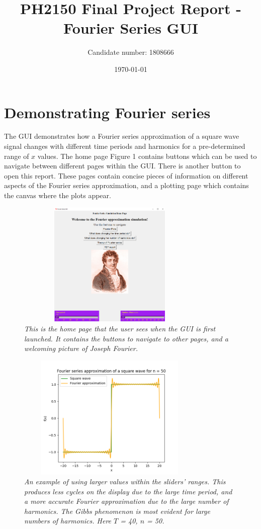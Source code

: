 \documentclass[11pt]{article}								%
\title{PH2150 Final Project Report - Fourier Series GUI}
\author{Candidate number: 1808666}
\date{\today}                                      							%
\begin{document}
\maketitle
\section{Demonstrating Fourier series \label{sec:section1}}
The GUI demonstrates how a Fourier series approximation of a square wave signal changes with different time periods and harmonics for a pre-determined range of $x$ values. The home page Figure 1 contains buttons which can be used to navigate between different pages within the GUI. There is another button to open this report. These pages contain concise pieces of information on different aspects of the Fourier series approximation, and a plotting page which contains the canvas where the plots appear.
\begin{figure}[ht]
\includegraphics[width=9cm, height=6cm]{home_page3}
\centering
\caption{\emph{This is the home page that the user sees when the GUI is first launched. It contains the  buttons to navigate to other pages, and a welcoming picture of Joseph Fourier.}}
\label{fig:homepg}
\end{figure}
\begin{figure}[ht]
\includegraphics[width=9cm, height=6cm]{large_values1}
\centering
\caption{\emph{An example of using larger values within the sliders' ranges. This produces less cycles on the display due to the large time period, and a more accurate Fourier approximation due to the large number of harmonics. The Gibbs phenomenon is most evident for large numbers of harmonics. Here $T$ = 40, $n$ = 50.}}
\end{figure}
\end{document}
